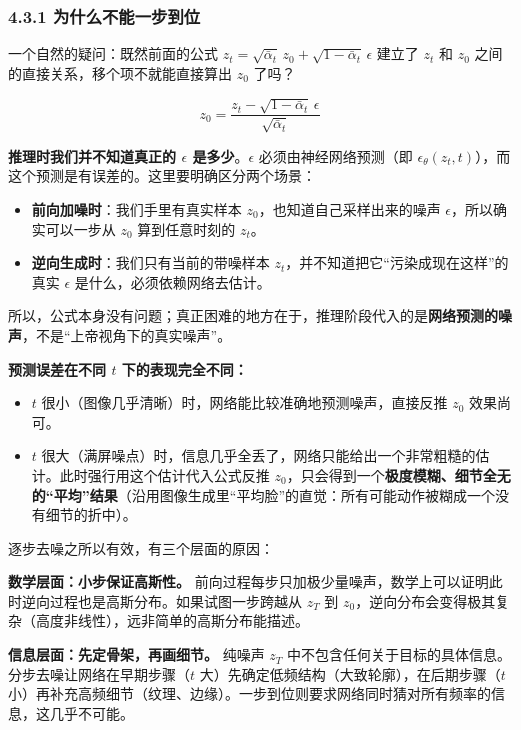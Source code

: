 \documentclass[
  chinese,
]{ctexart}
\providecommand{\tightlist}{%
  \setlength{\itemsep}{0pt}\setlength{\parskip}{0pt}}
\begin{document}
\subsubsection{4.3.1
为什么不能一步到位}\label{ux4e3aux4ec0ux4e48ux4e0dux80fdux4e00ux6b65ux5230ux4f4d}

一个自然的疑问：既然前面的公式
\(z_t = \sqrt{\bar{\alpha}_t}\, z_0 + \sqrt{1 - \bar{\alpha}_t}\, \epsilon\)
建立了 \(z_t\) 和 \(z_0\) 之间的直接关系，移个项不就能直接算出 \(z_0\)
了吗？

\[
z_0 = \frac{z_t - \sqrt{1 - \bar{\alpha}_t}\, \epsilon}{\sqrt{\bar{\alpha}_t}}
\]

\textbf{推理时我们并不知道真正的 \(\epsilon\) 是多少}。\(\epsilon\)
必须由神经网络预测（即
\(\epsilon_\theta(z_t, t)\)），而这个预测是有误差的。这里要明确区分两个场景：

\begin{itemize}
\tightlist
\item
  \textbf{前向加噪时}：我们手里有真实样本
  \(z_0\)，也知道自己采样出来的噪声 \(\epsilon\)，所以确实可以一步从
  \(z_0\) 算到任意时刻的 \(z_t\)。
\item
  \textbf{逆向生成时}：我们只有当前的带噪样本
  \(z_t\)，并不知道把它``污染成现在这样''的真实 \(\epsilon\)
  是什么，必须依赖网络去估计。
\end{itemize}

所以，公式本身没有问题；真正困难的地方在于，推理阶段代入的是\textbf{网络预测的噪声}，不是``上帝视角下的真实噪声''。

\textbf{预测误差在不同 \(t\) 下的表现完全不同：}

\begin{itemize}
\tightlist
\item
  \(t\) 很小（图像几乎清晰）时，网络能比较准确地预测噪声，直接反推
  \(z_0\) 效果尚可。
\item
  \(t\)
  很大（满屏噪点）时，信息几乎全丢了，网络只能给出一个非常粗糙的估计。此时强行用这个估计代入公式反推
  \(z_0\)，只会得到一个\textbf{极度模糊、细节全无的``平均''结果}（沿用图像生成里``平均脸''的直觉：所有可能动作被糊成一个没有细节的折中）。
\end{itemize}

逐步去噪之所以有效，有三个层面的原因：

\textbf{数学层面：小步保证高斯性。}
前向过程每步只加极少量噪声，数学上可以证明此时逆向过程也是高斯分布。如果试图一步跨越从
\(z_T\) 到
\(z_0\)，逆向分布会变得极其复杂（高度非线性），远非简单的高斯分布能描述。

\textbf{信息层面：先定骨架，再画细节。} 纯噪声 \(z_T\)
中不包含任何关于目标的具体信息。分步去噪让网络在早期步骤（\(t\)
大）先确定低频结构（大致轮廓），在后期步骤（\(t\)
小）再补充高频细节（纹理、边缘）。一步到位则要求网络同时猜对所有频率的信息，这几乎不可能。
\end{document}
